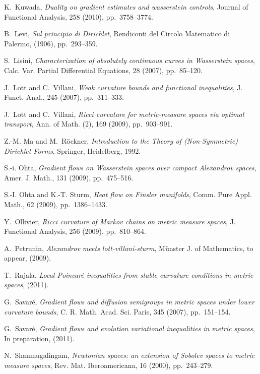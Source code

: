 \documentclass[reqno,11pt]{article}
\numberwithin{equation}{section}
\begin{document}
\begin{thebibliography}{10}
{\sc K.~Kuwada}, {\em Duality on gradient estimates and wasserstein controls},
  Journal of Functional Analysis, 258 (2010), pp.~3758--3774.

{\sc B.~Levi}, {\em Sul principio di {D}irichlet}, Rendiconti del Circolo
  Matematico di Palermo,  (1906), pp.~293--359.

{\sc S.~Lisini}, {\em Characterization of absolutely continuous curves in
  {W}asserstein spaces}, Calc. Var. Partial Differential Equations, 28 (2007),
  pp.~85--120.

{\sc J.~Lott and C.~Villani}, {\em Weak curvature bounds and functional
  inequalities}, J. Funct. Anal., 245 (2007), pp.~311--333.

{\sc J.~Lott and C.~Villani}, {\em Ricci curvature for metric-measure spaces
  via optimal transport}, Ann. of Math. (2), 169 (2009), pp.~903--991.

{\sc Z.-M. Ma and M.~R\"ockner}, {\em Introduction to the Theory of
  (Non-Symmetric) Dirichlet Forms}, Springer, Heidelberg, 1992.

{\sc S.-i. Ohta}, {\em Gradient flows on {W}asserstein spaces over compact
  {A}lexandrov spaces}, Amer. J. Math., 131 (2009), pp.~475--516.

{\sc S.-I. Ohta and K.-T. Sturm}, {\em Heat flow on {F}insler manifolds}, Comm.
  Pure Appl. Math., 62 (2009), pp.~1386--1433.

{\sc Y.~Ollivier}, {\em Ricci curvature of {M}arkov chains on metric measure
  spaces}, J. Functional Analysis, 256 (2009), pp.~810--864.

{\sc A.~Petrunin}, {\em Alexandrov meets lott-villani-sturm}, M\"unster J. of
  Mathematics, to appear,  (2009).

{\sc T.~Rajala}, {\em Local {P}oincar\'e inequalities from stable curvature
  conditions in metric spaces},  (2011).

{\sc G.~Savar{\'e}}, {\em Gradient flows and diffusion semigroups in metric
  spaces under lower curvature bounds}, C. R. Math. Acad. Sci. Paris, 345
  (2007), pp.~151--154.

{\sc G.~Savar\'e}, {\em Gradient flows and evolution variational inequalities
  in metric spaces}, In preparation,  (2011).

{\sc N.~Shanmugalingam}, {\em Newtonian spaces: an extension of {S}obolev
  spaces to metric measure spaces}, Rev. Mat. Iberoamericana, 16 (2000),
  pp.~243--279.


\end{thebibliography}
\end{document}
